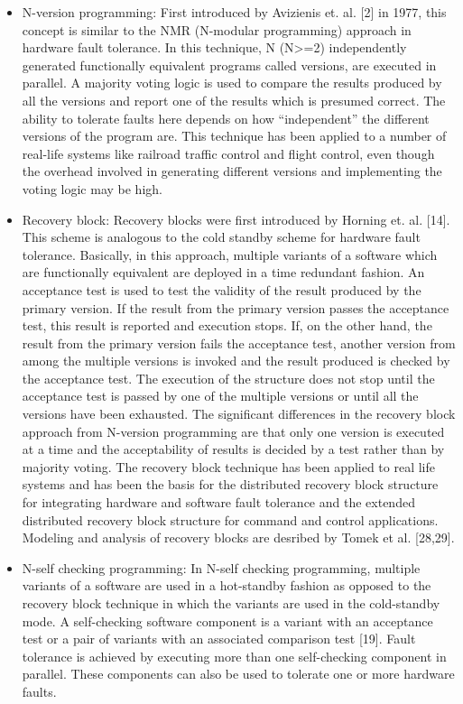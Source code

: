 \documentclass[a4paper, 11pt]{article}
\begin{document}
\begin{itemize}
\item N-version programming: First introduced by Avizienis et. al. [2] in 1977, this concept is similar to the NMR (N-modular programming) approach in hardware fault tolerance. In this technique, N (N>=2) independently generated functionally equivalent programs called versions, are executed in parallel. A majority voting logic is used to compare the results produced by all the versions and report one of the results which is presumed correct. The ability to tolerate faults here depends on how ``independent'' the different versions of the program are. This technique has been applied to a number of real-life systems like railroad traffic control and flight control, even though the overhead involved in generating different versions and implementing the voting logic may be high.
\item Recovery block: Recovery blocks were first introduced by Horning et. al. [14]. This scheme is analogous to the cold standby scheme for hardware fault tolerance. Basically, in this approach, multiple variants of a software which are functionally equivalent are deployed in a time redundant fashion. An acceptance test is used to test the validity of the result produced by the primary version. If the result from the primary version passes the acceptance test, this result is reported and execution stops. If, on the other hand, the result from the primary version fails the acceptance test, another version from among the multiple versions is invoked and the result produced is checked by the acceptance test. The execution of the structure does not stop until the acceptance test is passed by one of the multiple versions or until all the versions have been exhausted. The significant differences in the recovery block approach from N-version programming are that only one version is executed at a time and the acceptability of results is decided by a test rather than by majority voting. The recovery block technique has been applied to real life systems and has been the basis for the distributed recovery block structure for integrating hardware and software fault tolerance and the extended distributed recovery block structure for command and control applications. Modeling and analysis of recovery blocks are desribed by Tomek et al. [28,29].
\item N-self checking programming: In N-self checking programming, multiple variants of a software are used in a hot-standby fashion as opposed to the recovery block technique in which the variants are used in the cold-standby mode. A self-checking software component is a variant with an acceptance test or a pair of variants with an associated comparison test [19]. Fault tolerance is achieved by executing more than one self-checking component in parallel. These components can also be used to tolerate one or more hardware faults.
\end{itemize}
\end{document}
